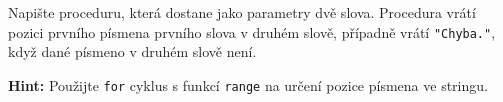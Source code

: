 \question[50]
Napište proceduru, která dostane jako parametry dvě slova. Procedura vrátí
pozici prvního písmena prvního slova v druhém slově, případně vrátí
\texttt{"Chyba."}, když dané písmeno v druhém slově není.

\textbf{Hint:} Použijte \texttt{for} cyklus s funkcí \texttt{range} na určení
pozice písmena ve stringu.